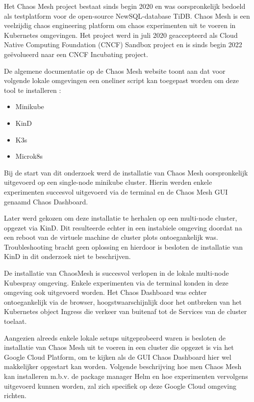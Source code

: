 Het Chaos Mesh project bestaat sinds begin 2020 en was oorspronkelijk bedoeld als testplatform voor de open-source NewSQL-database TiDB. Chaos Mesh is een veelzijdig chaos engineering platform om chaos experimenten uit te voeren in Kubernetes omgevingen. Het project werd in juli 2020 geaccepteerd als Cloud Native Computing Foundation (CNCF) Sandbox project en is sinds begin 2022 geëvolueerd naar een CNCF Incubating project. \autocite{CNCF2022b}


De algemene documentatie op de Chaos Mesh website toont aan dat voor volgende lokale omgevingen een oneliner script kan toegepast worden om deze tool te installeren \autocite{ChaosMesh2022}: 
\begin{itemize}
    \item Minikube
    \item KinD
    \item K3s
    \item Microk8s
\end{itemize}

Bij de start van dit onderzoek werd de installatie van Chaos Mesh oorspronkelijk uitgevoerd op een single-node minikube cluster. Hierin werden enkele experimenten succesvol uitgevoerd via de terminal en de Chaos Mesh GUI genaamd Chaos Dashboard.

Later werd gekozen om deze installatie te herhalen op een multi-node cluster, opgezet via KinD. Dit resulteerde echter in een instabiele omgeving doordat na een reboot van de virtuele machine de cluster plots ontoegankelijk was. Troubleshooting bracht geen oplossing en hierdoor is besloten de installatie van KinD in dit onderzoek niet te beschrijven.

De installatie van ChaosMesh is succesvol verlopen in de lokale multi-node Kubespray omgeving. Enkele experimenten via de terminal konden in deze omgeving ook uitgevoerd worden. Het Chaos Dashboard was echter ontoegankelijk via de browser, hoogstwaarschijnlijk door het ontbreken van het Kubernetes object Ingress die verkeer van buitenaf tot de Services van de cluster toelaat.  

Aangezien alreeds enkele lokale setups uitgeprobeerd waren is besloten de installatie van Chaos Mesh uit te voeren in een cluster die opgezet is via het Google Cloud Platform, om te kijken als de GUI Chaos Dashboard hier wel makkelijker opgestart kan worden. Volgende beschrijving hoe men Chaos Mesh kan installeren m.b.v. de package manager Helm en hoe experimenten vervolgens uitgevoerd kunnen worden, zal zich specifiek op deze Google Cloud omgeving richten. \autocite{ChaosMesh2022a}

